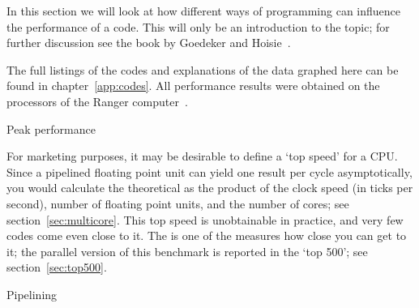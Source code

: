 
In this section we will look at how different ways of programming can
influence the performance of a code. This will only be an introduction
to the topic; for further discussion see the book by Goedeker and
Hoisie~\cite{Goedeker:performance-book}.

The full listings of the codes and explanations of the data graphed
here can be found in chapter~\ref{app:codes}. All performance results
were obtained on the  processors of the Ranger
computer~\cite{tacc:ranger}.

 {Peak performance}

For marketing purposes, it may be desirable to define a `top speed' for a
CPU. Since a pipelined floating point unit can yield one result per
cycle asymptotically, you would calculate the theoretical
 as the product of the clock speed (in
ticks per second), number of floating point units, and the number of
cores; see section~\ref{sec:multicore}.  This top speed is
unobtainable in practice, and very few codes come even close to it.
The  is one of the measures how close
you can get to it; the parallel version of this benchmark is reported
in the `top 500'; see section~\ref{sec:top500}. 

 {Pipelining}
\label{sec:coding-pipeline}

